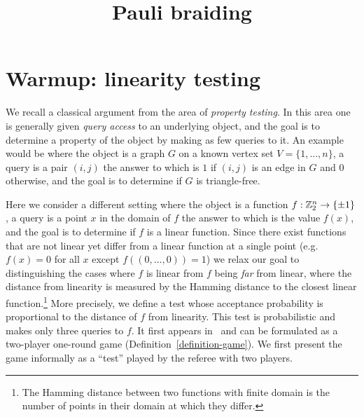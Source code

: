 




\title{Pauli braiding}
\label{paulibraiding}

\maketitle

\label{section-phantom}

\tableofcontents

\section{Warmup: linearity testing}

We recall a classical argument from the area of \emph{property testing}. In this area one is generally given \emph{query access} to an underlying object, and the goal is to determine a property of the object by making as few queries to it. An example would be where the object is a graph $G$ on a known vertex set $V = \{1,\ldots, n\}$, a query is a pair $(i,j)$ the answer to which is $1$ if $(i,j)$ is an edge in $G$ and $0$ otherwise, and the goal is to determine if $G$ is triangle-free. 

Here we consider a different setting where the object is a function $f:\mathbb{Z}_2^n\to\{\pm1 \}$, a query is a point $x$ in the domain of $f$ the answer to which is the value $f(x)$, and the goal is to determine if $f$ is a linear function. Since there exist functions that are not linear yet differ from a linear function at a single point (e.g.\ $f(x)=0$ for all $x$ except $f((0,\ldots,0))=1$) we relax our goal to distinguishing the cases where $f$ is linear from $f$ being \emph{far} from linear, where the distance from linearity is measured by the Hamming distance to the closest linear function.\footnote{The Hamming distance between two functions with finite domain is the number of points in their domain at which they differ.} More precisely, we define a test whose acceptance probability is proportional to the distance of $f$ from linearity. This test is probabilistic and makes only three queries to $f$. It first appears in~\cite{blum1993self} and can be formulated as a two-player one-round game (Definition~\ref{definition-game}). We first present the game informally as a ``test'' played by the referee with two players.  

